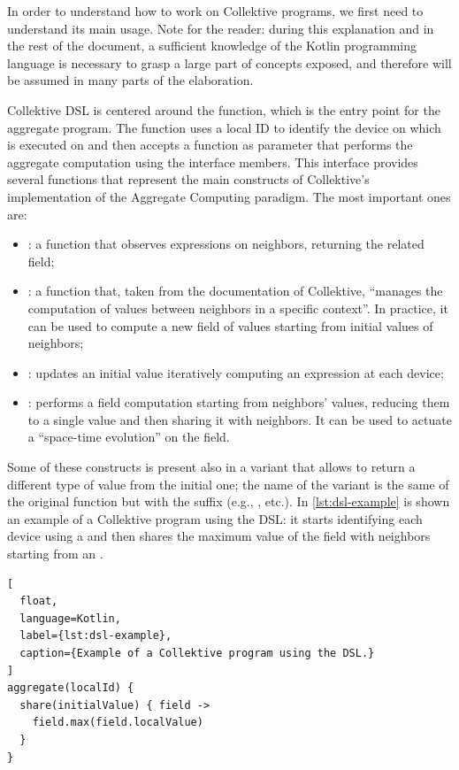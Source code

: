 \documentclass[12pt,a4paper,openright,twoside]{book}
\begin{document}
In order to understand how to work on Collektive programs, we first need to
understand its main usage. Note for the reader: during this explanation and in
the rest of the document, a sufficient knowledge of the Kotlin programming
language is necessary to grasp a large part of concepts exposed, and therefore
will be assumed in many parts of the elaboration.

Collektive DSL is centered around the  function, which is the
entry point for the aggregate program. The function uses a local ID to identify
the device on which is executed on and then accepts a function as parameter that
performs the aggregate computation using the  interface members.
%
This interface provides several functions that represent the main constructs of
Collektive's implementation of the Aggregate Computing paradigm. The most
important ones are:
\begin{itemize}
  \item {}: a function that observes expressions on
  neighbors, returning the related field;
  \item {}: a function that, taken from the documentation of
  Collektive, ``manages the computation of values between neighbors in a
  specific context''. In practice, it can be used to compute a new field of 
  values starting from initial values of neighbors;
  \item {}: updates an initial value iteratively computing an
  expression at each device;
  \item {}: performs a field computation starting from neighbors'
  values, reducing them to a single value and then sharing it with neighbors. 
  It can be used to actuate a ``space-time evolution'' on the field.
\end{itemize}

Some of these constructs is present also in a variant that allows to return a
different type of value from the initial one; the name of the variant is the
same of the original function but with the suffix  (e.g.,
,  etc.). In \cref{lst:dsl-example} is shown an
example of a Collektive program using the \ac{DSL}: it starts identifying each
device using a  and then shares the maximum value of the field
with neighbors starting from an .

\begin{lstlisting}[
  float, 
  language=Kotlin, 
  label={lst:dsl-example},
  caption={Example of a Collektive program using the DSL.}
]
aggregate(localId) {
  share(initialValue) { field ->
    field.max(field.localValue)
  }
}
\end{lstlisting}
\end{document}
